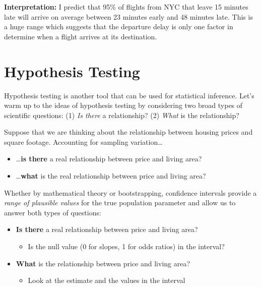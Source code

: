 \documentclass[
]{book}
\providecommand{\tightlist}{%
  \setlength{\itemsep}{0pt}\setlength{\parskip}{0pt}}
\begin{document}
\textbf{Interpretation:} I predict that 95\% of flights from NYC that leave 15 minutes late will arrive on average between 23 minutes early and 48 minutes late. This is a huge range which suggests that the departure delay is only one factor in determine when a flight arrives at its destination.

\section{Hypothesis Testing}\label{hypothesis-testing}

Hypothesis testing is another tool that can be used for statistical inference. Let's warm up to the ideas of hypothesis testing by considering two broad types of scientific questions: (1) \emph{Is there} a relationship? (2) \emph{What} is the relationship?

Suppose that we are thinking about the relationship between housing prices and square footage. Accounting for sampling variation\ldots{}

\begin{itemize}
\tightlist
\item
  \ldots{}\textbf{is there} a real relationship between price and living area?
\item
  \ldots{}\textbf{what} is the real relationship between price and living area?
\end{itemize}

Whether by mathematical theory or bootstrapping, confidence intervals provide a \emph{range of plausible values} for the true population parameter and allow us to answer both types of questions:

\begin{itemize}
\tightlist
\item
  \textbf{Is there} a real relationship between price and living area?

  \begin{itemize}
  \tightlist
  \item
    Is the null value (0 for slopes, 1 for odds ratios) in the interval?
  \end{itemize}
\item
  \textbf{What} is the relationship between price and living area?

  \begin{itemize}
  \tightlist
  \item
    Look at the estimate and the values in the interval
  \end{itemize}
\end{itemize}
\end{document}

